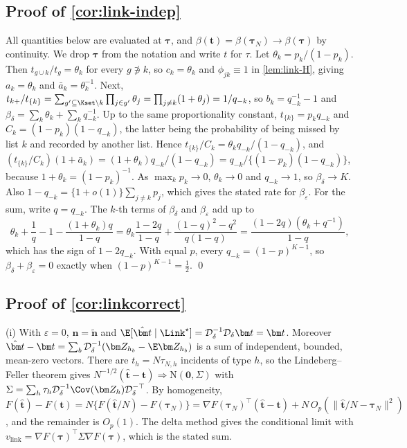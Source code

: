 \subsection{Proof of \texorpdfstring{\cref{cor:link-indep}}{the independent-capture corollary}}\label{app:link-indep}

All quantities below are evaluated at $\bm\tau$, and $\beta(\bm t)=\beta(\bm\tau_N)\to\beta(\bm\tau)$ by continuity. We drop $\bm\tau$ from the notation and write $t$ for $\tau$. Let $\theta_k=p_k/(1-p_k)$. Then $t_{g\cup k}/t_g=\theta_k$ for every $g\not\ni k$, so $c_k=\theta_k$ and $\phi_{jk}\equiv1$ in \cref{lem:link-H}, giving $a_k=\theta_k$ and $\bar a_k=\theta_k^{-1}$. Next, $t_{k+}/t_{\{k\}}=\sum_{g'\subseteq\Kset\setminus k}\prod_{j\in g'}\theta_j=\prod_{j\ne k}(1+\theta_j)=1/q_{-k}$, so $b_k=q_{-k}^{-1}-1$ and $\beta_\delta=\sum_k\theta_k+\sum_kq_{-k}^{-1}$. Up to the same proportionality constant, $t_{\{k\}}=p_kq_{-k}$ and $C_k=(1-p_k)(1-q_{-k})$, the latter being the probability of being missed by list $k$ and recorded by another list. Hence $t_{\{k\}}/C_k=\theta_kq_{-k}/(1-q_{-k})$, and $(t_{\{k\}}/C_k)(1+\bar a_k)=(1+\theta_k)q_{-k}/(1-q_{-k})=q_{-k}/\{(1-p_k)(1-q_{-k})\}$, because $1+\theta_k=(1-p_k)^{-1}$. As $\max_kp_k\to0$, $\theta_k\to0$ and $q_{-k}\to1$, so $\beta_\delta\to K$. Also $1-q_{-k}=\{1+o(1)\}\sum_{j\ne k}p_j$, which gives the stated rate for $\beta_\varepsilon$. For the sum, write $q=q_{-k}$. The $k$-th terms of $\beta_\delta$ and $\beta_\varepsilon$ add up to
\[
  \theta_k+\frac1q-1-\frac{(1+\theta_k)q}{1-q}
  =\theta_k\frac{1-2q}{1-q}+\frac{(1-q)^2-q^2}{q(1-q)}
  =\frac{(1-2q)(\theta_k+q^{-1})}{1-q},
\]
which has the sign of $1-2q_{-k}$. With equal $p$, every $q_{-k}=(1-p)^{K-1}$, so $\beta_\delta+\beta_\varepsilon=0$ exactly when $(1-p)^{K-1}=\frac12$. \qed

\subsection{Proof of \texorpdfstring{\cref{cor:linkcorrect}}{the linkage-corrected estimator}}\label{app:link-correct}

(i) With $\varepsilon=0$, $\bm n=\tilde{\bm n}$ and $\E[\hat{\bm t}\mid\Link^\star]=\mathcal D_\delta^{-1}\mathcal D_\delta\bm t=\bm t$. Moreover $\hat{\bm t}-\bm t=\sum_b\mathcal D_\delta^{-1}(\bm Z_{h_b}-\E\bm Z_{h_b})$ is a sum of independent, bounded, mean-zero vectors. There are $t_h=N\tau_{N,h}$ incidents of type $h$, so the Lindeberg--Feller theorem gives $N^{-1/2}(\hat{\bm t}-\bm t)\Rightarrow\mathrm N(\bm0,\Sigma)$ with $\Sigma=\sum_h\tau_h\mathcal D_\delta^{-1}\Cov(\bm Z_h)\mathcal D_\delta^{-\top}$. By homogeneity, $F(\hat{\bm t})-F(\bm t)=N\{F(\hat{\bm t}/N)-F(\bm\tau_N)\}=\nabla F(\bm\tau_N)^{\top}(\hat{\bm t}-\bm t)+N\,O_p(\|\hat{\bm t}/N-\bm\tau_N\|^2)$, and the remainder is $O_p(1)$. The delta method gives the conditional limit with $v_{\mathrm{link}}=\nabla F(\bm\tau)^{\top}\Sigma\nabla F(\bm\tau)$, which is the stated sum.

